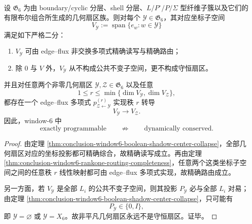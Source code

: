 \begin{corollary}[可编程性与守恒性的严格分离]\label{cor:conclusion-window6-programmable-not-conserved}
设 \(\mathfrak G_6\) 为由 boundary/cyclic 分层、shell 分层、\(L/P^\circ/P/\Sigma\) 型纤维子簇以及它们的有限布尔组合所生成的几何扇区族。则对每个 \(\mathcal Y\in \mathfrak G_6\)，其对应坐标子空间
\[
V_{\mathcal Y}:=\operatorname{span}\{e_w:w\in \mathcal Y\}
\]
满足如下严格二分：
\begin{enumerate}
  \item \(V_{\mathcal Y}\) 可由 edge--flux 非交换多项式精确读写与精确路由；
  \item 除 \(0\) 与 \(V\) 外，\(V_{\mathcal Y}\) 从不构成公共不变子空间，更不构成守恒扇区。
\end{enumerate}
并且对任意两个非零几何扇区 \(\mathcal Y,\mathcal Z\in \mathfrak G_6\) 以及任意
\[
1\le r\le \min\{\dim V_{\mathcal Y},\dim V_{\mathcal Z}\},
\]
都存在一个 edge--flux 多项式 \(p_{\mathcal Z\leftarrow \mathcal Y}^{(r)}\) 实现秩 \(r\) 转导
\[
V_{\mathcal Y}\to V_{\mathcal Z}.
\]
因此，window-\(6\) 中
\[
\boxed{\text{exactly programmable}}
\qquad\not\Rightarrow\qquad
\boxed{\text{dynamically conserved}}.
\]
\end{corollary}
\begin{proof}
由定理 \ref{thm:conclusion-window6-boolean-shadow-center-collapse}，全部几何扇区对应的坐标投影都可精确综合，故精确读写成立。再由定理 \ref{thm:conclusion-window6-rankone-routing-completeness}，任意两个这类坐标子空间之间的任意秩 \(r\) 线性映射都可由 edge--flux 多项式实现，故精确路由成立。

另一方面，若 \(V_{\mathcal Y}\) 是全部 \(L_i\) 的公共不变子空间，则其投影 \(P_{\mathcal Y}\) 必与全部 \(L_i\) 对易；由定理 \ref{thm:conclusion-window6-boolean-shadow-center-collapse}，只可能有
\[
P_{\mathcal Y}\in\{0,I\},
\]
即 \(\mathcal Y=\varnothing\) 或 \(\mathcal Y=X_6\)。故非平凡几何扇区永远不是守恒扇区。证毕。
\end{proof}

